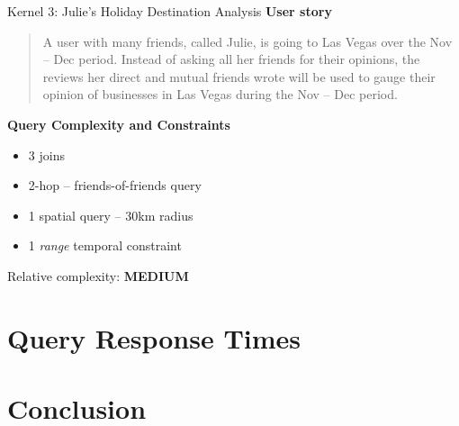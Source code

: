 \begin{frame}{Kernel 3: Julie's Holiday Destination Analysis}
    \textbf{User story}
    \begin{quote}
        A user with many friends, called Julie, is going to Las Vegas over the Nov -- Dec period. Instead of asking all her friends for their opinions, the reviews her direct and mutual friends wrote will be used to gauge their opinion of businesses in Las Vegas during the Nov -- Dec period.
    \end{quote}
    \textbf{Query Complexity and Constraints}
    \begin{itemize}
        \item 3 joins
        \item 2-hop -- friends-of-friends query
        \item 1 spatial query -- 30km radius
        \item 1 \emph{range} temporal constraint
    \end{itemize}
    
    \medskip
    
    Relative complexity: \textbf{MEDIUM}
\end{frame}

\section{Query Response Times}







\section{Conclusion}

